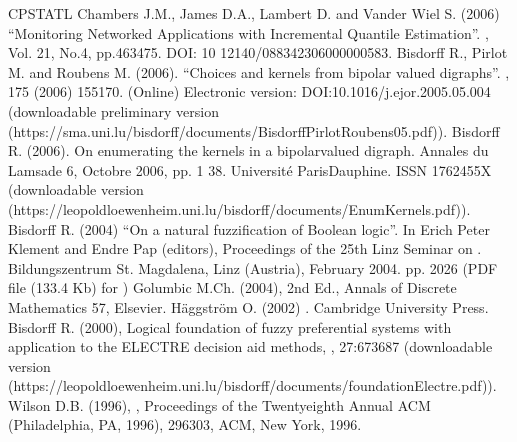 \documentclass[a4paper,10pt,english]{sphinxhowto}
\begin{document}
\begin{sphinxthebibliography}{CPSTAT\sphinxhyphen{}L}
Chambers J.M., James D.A., Lambert D. and Vander Wiel S. (2006) “Monitoring Networked Applications with Incremental Quantile Estimation”. , Vol. 21, No.4, pp.463\sphinxhyphen{}475. DOI: 10 12140/088342306000000583.
Bisdorff R., Pirlot M. and Roubens M. (2006). “Choices and kernels from bipolar valued digraphs”. , 175 (2006) 155\sphinxhyphen{}170. (Online) Electronic version: DOI:10.1016/j.ejor.2005.05.004 (downloadable preliminary version  (https://sma.uni.lu/bisdorff/documents/BisdorffPirlotRoubens05.pdf)).
Bisdorff R. (2006). On enumerating the kernels in a bipolar\sphinxhyphen{}valued digraph. Annales du Lamsade 6, Octobre 2006, pp. 1 \sphinxhyphen{} 38. Université Paris\sphinxhyphen{}Dauphine. ISSN 1762\sphinxhyphen{}455X (downloadable version  (https://leopold\sphinxhyphen{}loewenheim.uni.lu/bisdorff/documents/EnumKernels.pdf)).
Bisdorff R. (2004) “On a natural fuzzification of Boolean logic”. In Erich Peter Klement and Endre Pap (editors), Proceedings of the 25th Linz Seminar on . Bildungszentrum St. Magdalena, Linz (Austria), February 2004. pp. 20\sphinxhyphen{}26 (PDF file (133.4 Kb) for )
Golumbic M.Ch. (2004),  2nd Ed., Annals of Discrete Mathematics 57, Elsevier.
Häggström O. (2002) . Cambridge University Press.
Bisdorff R. (2000), Logical foundation of fuzzy preferential systems with application to the ELECTRE decision aid methods, , 27:673\sphinxhyphen{}687 (downloadable version  (https://leopold\sphinxhyphen{}loewenheim.uni.lu/bisdorff/documents/foundationElectre.pdf)).
Wilson D.B. (1996), , Proceedings of the Twenty\sphinxhyphen{}eighth Annual ACM  (Philadelphia, PA, 1996), 296\sphinxhyphen{}303, ACM, New York, 1996.

\end{sphinxthebibliography}
\end{document}
